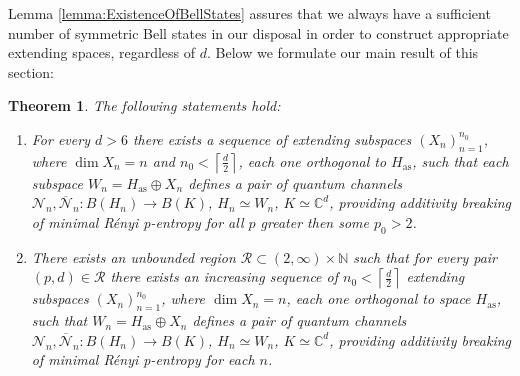 \documentclass[reqno]{amsart}
\theoremstyle{plain}
\newtheorem{theorem}{Theorem}
\theoremstyle{note}
\newcommand{\ceil}[1]{\left\lceil #1 \right\rceil}
\newcommand{\aspace}{H_{\mathrm{as}}}
\newcommand{\complexes}{\mathbb{C}}
\newcommand{\naturals}{\mathbb{N}}
\begin{document}
Lemma \ref{lemma:ExistenceOfBellStates} assures that we always have a sufficient number of symmetric Bell states in our disposal in order to construct appropriate extending spaces, regardless of $d$. Below we formulate our main result of this section:

\begin{theorem}\label{thm:ResultBell} The following statements hold:
\begin{enumerate}
    \item\label{item:ResultBellitem1} 
    For every $d > 6$ there exists a sequence of extending subspaces $(X_n)_{n=1}^{n_0}$, where $\dim{X_n}=n$ and $n_0 < \ceil{\frac{d}{2}}$, each one orthogonal to $\aspace$, such that each subspace $W_n = \aspace\oplus X_n$ defines a pair of quantum channels $\mathcal{N}_n, \overline{\mathcal{N}}_n  : B(H_n) \to B(K)$, $H_n\simeq W_n$, $K \simeq \complexes^d$, providing additivity breaking of minimal R\'{e}nyi \textit{p}-entropy for all $p$ greater then some $p_0 > 2$.
    \item\label{item:ResultBellitem2} There exists an unbounded region $\mathcal{R} \subset (2, \infty ) \times \naturals$ such that for every pair $(p,d)\in\mathcal{R}$ there exists an increasing sequence of $n_0 < \ceil{\frac{d}{2}}$ extending subspaces $(X_n)_{n=1}^{n_0}$, where $\dim{X_n} = n$, each one orthogonal to space $\aspace$, such that $W_n = \aspace \oplus X_n$ defines a pair of quantum channels $\mathcal{N}_n, \overline{\mathcal{N}}_n  : B(H_n) \to B(K)$, $H_n\simeq W_n$, $K \simeq \complexes^d$, providing additivity breaking of minimal R\'{e}nyi \textit{p}-entropy for each $n$.
\end{enumerate}
\end{theorem}
\end{document}
